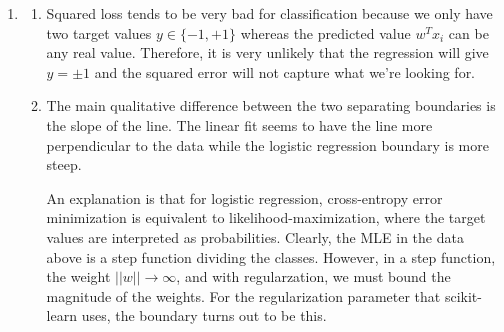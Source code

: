 \documentclass[12pt]{article}
\begin{document}
\begin{enumerate}[leftmargin=*]
\item
\begin{enumerate}[label = \Alph*.]
\item Squared loss tends to be very bad for classification because we only have two target values $y \in \{-1, +1\}$ whereas the predicted value $w^T x_i$ can be any real value. Therefore, it is very unlikely that the regression will give $y = \pm 1$ and the squared error will not capture what we're looking for.
\item The main qualitative difference between the two separating boundaries is the slope of the line. The linear fit seems to have the line more perpendicular to the data while the logistic regression boundary is more steep.

An explanation is that for logistic regression, cross-entropy error minimization is equivalent to likelihood-maximization, where the target values are interpreted as probabilities. Clearly, the MLE in the data above is a step function dividing the classes. However, in a step function, the weight $||w|| \to \infty$, and with regularzation, we must bound the magnitude of the weights. For the regularization parameter that scikit-learn uses, the boundary turns out to be this.


\end{enumerate}
\end{enumerate}
\end{document}
